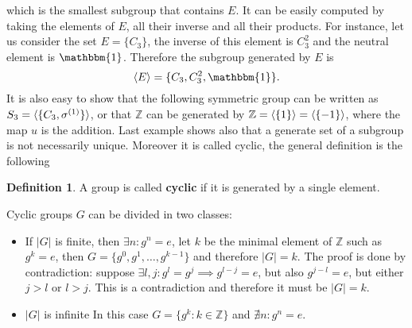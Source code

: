 \documentclass[12pt]{book}
\theoremstyle{plain}
\newcommand{\I}{\mathbbm{1}}
\newcommand{\Z}{\mathbb{Z}}
\theoremstyle{definition}
\newtheorem{dfn}[thm]{Definition}
\theoremstyle{remark}
\begin{document}
which is the smallest subgroup that contains $E$. It can be easily computed by taking the elements of $E$, all their inverse and all their products. For instance, let us consider the set $E = \{C_3\}$, the inverse of this element is $C_3^2$ and the neutral element is $\I$. Therefore the subgroup generated by $E$ is
\[\braket{E} = \{C_3,C_3^2,\I\}.\]
It is also easy to show that the following symmetric group can be written as $S_3 = \braket{\{C_3,\sigma^{(1)}\}}$, or that $\Z$ can be generated by $\Z = \braket{\{1\}}=\braket{\{-1\}}$, where the map $u$ is the addition. Last example shows also that a generate set of a subgroup is not necessarily unique. Moreover it is called cyclic, the general definition is the following
\begin{dfn}
A group is called \textbf{cyclic} if it is generated by a single element.
\end{dfn}
Cyclic groups $G$ can be divided in two classes:
\begin{itemize}
	\item If $|G|$ is finite, then $\exists n:g^n = e$, let $k$ be the minimal element of $\Z$ such as $g^k = e$, then $G = \{g^0,g^1,\dots,g^{k-1}\}$ and therefore $|G|=k$. The proof is done by contradiction: suppose $\exists l,j: g^l = g^j \implies g^{l-j}=e$, but also $g^{j-l}=e$, but either $j>l$ or $l>j$. This is a contradiction and therefore it must be $|G|=k$.
	\item $|G|$ is infinite In this case $G = \{g^k:k\in\Z\}$ and $\nexists n:g^n = e$.
\end{itemize}
\end{document}
